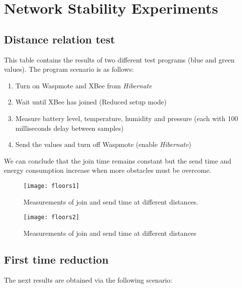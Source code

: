 \clearpage
\section{Network Stability Experiments}

\subsection{Distance relation test}
\label{timess}
This table contains the results of two different test programs (blue and green values). The program scenario is as follows:\\
\begin{enumerate}
\item Turn on Waspmote and XBee from \textit{Hibernate}
\item Wait until XBee has joined (Reduced setup mode)
\item Measure battery level, temperature, humidity and pressure (each with 100 milliseconds delay between samples)
\item Send the values and turn off Waspmote (enable \textit{Hibernate})
\vspace{1cm}
\end{enumerate} 
\vspace{1cm}
\noindent
We can conclude that the join time remains constant but the send time and energy consumption increase when more obstacles must be overcome.
\begin{figure}[htbp]
\centering
\texttt{[image: floors1]}
\caption[XBee join and send times: distance relation]{Measurements of join and send time at different distances.}
\label{fig:floors1}
\end{figure}
\begin{figure}[htbp]
\centering
\texttt{[image: floors2]}
\caption[XBee join and send times: distance relation]{Measurements of join and send time at different distances}
\label{fig:floors2}
\end{figure}

\pagebreak


\subsection{First time reduction}

The next results are obtained via the following scenario:\\

